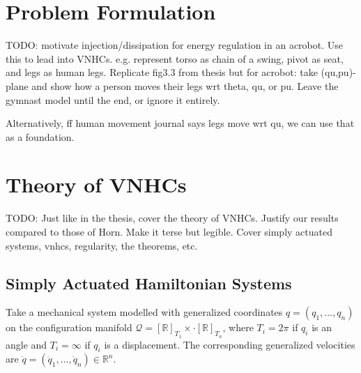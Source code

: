 \documentclass[journal,twoside,web]{ieeecolor}
\newcommand*{\Rt}[1]{[\R]_{#1}}
\newcommand*{\R}{\mathbb{R}}
\begin{document}
\section{Problem Formulation}\label{sec:problem-formulation}
TODO: motivate injection/dissipation for energy regulation in an acrobot. Use
this to lead into VNHCs. e.g. represent torso as chain of a swing, pivot as
seat, and legs as human legs. Replicate fig3.3 from thesis but for acrobot: take
(qu,pu)-plane and show how a person moves their legs wrt theta, qu, or pu. Leave
the gymnast model until the end, or ignore it entirely.

Alternatively, ff human movement journal says legs move wrt qu, we can use that
as a foundation.

\section{Theory of VNHCs}\label{sec:vnhc}
TODO: Just like in the thesis, cover the theory of VNHCs. Justify our results compared
to those of Horn. Make it terse but legible. Cover simply actuated systems,
vnhcs, regularity, the theorems, etc.


\subsection{Simply Actuated Hamiltonian Systems}
Take a mechanical system modelled with generalized coordinates 
\(q = (q_1, \ldots, q_n)\) on the configuration manifold
\(\mathcal{Q} = \Rt{T_1} \times \cdot \Rt{T_n}\), where
\(T_i = 2\pi\) if \(q_i\) is an angle and \(T_i = \infty\) if \(q_i\) is a
displacement. The corresponding generalized velocities are 
\(\dot{q} = (\dot{q}_1,\ldots,\dot{q}_n) \in \R^n\).
\end{document}

